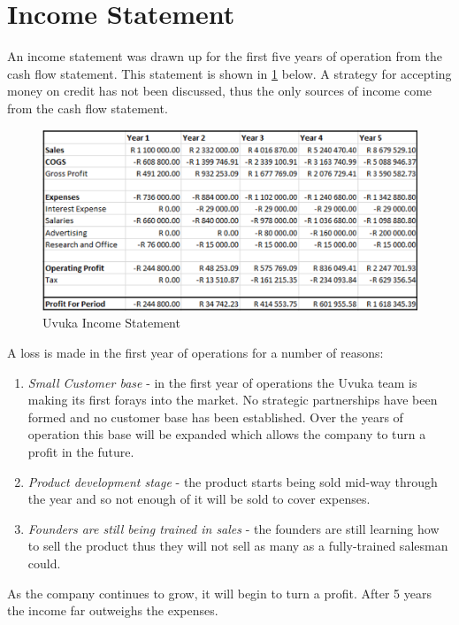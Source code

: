 \section{Income Statement}

An income statement was drawn up for the first five years of operation from the cash flow statement. This statement is shown in \cref{fig:IncomeStatement} below. A strategy for accepting money on credit has not been discussed, thus the only sources of income come from the cash flow statement. 

  \begin{figure}[H]
    \centering
    \includegraphics[width=1\textwidth]{images/IncomeStatement}
    \vskip10pt
    \caption[Uvuka Income Statement]{Uvuka Income Statement}
    \label{fig:IncomeStatement}
  \end{figure}

A loss is made in the first year of operations for a number of reasons:
  \begin{enumerate}
        \item \textit{Small Customer base} - in the first year of operations the Uvuka team is making its first forays into the market. No strategic partnerships have been formed and no customer base has been established. Over the years of operation this base will be expanded which allows the company to turn a profit in the future.
        \item \textit{Product development stage} - the product starts being sold mid-way through the year and so not enough of it will be sold to cover expenses.
        \item \textit{Founders are still being trained in sales} - the founders are still learning how to sell the product thus they will not sell as many as a fully-trained salesman could.
        \end{enumerate}
        
As the company continues to grow, it will begin to turn a profit. After 5 years the income far outweighs the expenses.

